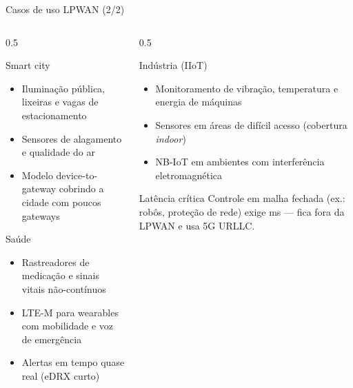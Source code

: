 \documentclass[aspectratio=169,11pt]{beamer}
\begin{document}
\begin{frame}{Casos de uso LPWAN (2/2)}
  \small
  \begin{columns}[t]
    \begin{column}{0.5\textwidth}
      \begin{block}{Smart city}
        \begin{itemize}
          \item Iluminação pública, lixeiras e vagas de estacionamento
          \item Sensores de alagamento e qualidade do ar
          \item Modelo device-to-gateway cobrindo a cidade com poucos gateways
        \end{itemize}
      \end{block}
      \begin{block}{Saúde}
        \begin{itemize}
          \item Rastreadores de medicação e sinais vitais não-contínuos
          \item LTE-M para wearables com mobilidade e voz de emergência
          \item Alertas em tempo quase real (eDRX curto)
        \end{itemize}
      \end{block}
    \end{column}
    \begin{column}{0.5\textwidth}
      \begin{block}{Indústria (IIoT)}
        \begin{itemize}
          \item Monitoramento de vibração, temperatura e energia de máquinas
          \item Sensores em áreas de difícil acesso (cobertura \emph{indoor})
          \item NB-IoT em ambientes com interferência eletromagnética
        \end{itemize}
      \end{block}
      \pause
      \begin{alertblock}{Latência crítica}
        Controle em malha fechada (ex.: robôs, proteção de rede) exige ms --- fica fora da LPWAN e usa 5G URLLC.
      \end{alertblock}
    \end{column}
  \end{columns}
\end{frame}
\end{document}
